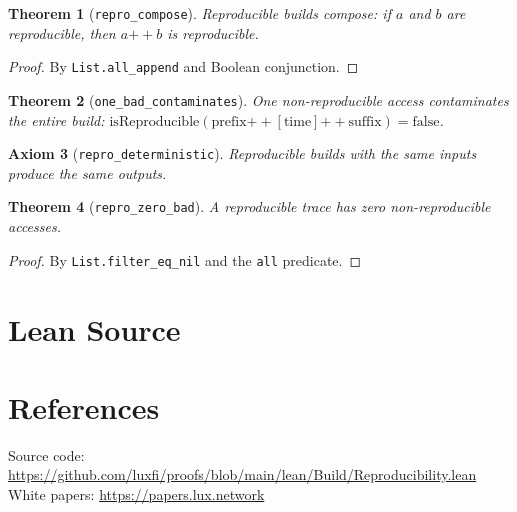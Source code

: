 \documentclass[11pt]{article}
\newtheorem{theorem}{Theorem}
\newtheorem{axiom_stmt}[theorem]{Axiom}
\begin{document}
\begin{theorem}[\texttt{repro\_compose}]
Reproducible builds compose: if $a$ and $b$ are reproducible, then $a \mathbin{++} b$ is reproducible.
\end{theorem}
\begin{proof}
By \texttt{List.all\_append} and Boolean conjunction.
\end{proof}

\begin{theorem}[\texttt{one\_bad\_contaminates}]
One non-reproducible access contaminates the entire build: $\text{isReproducible}(\text{prefix} \mathbin{++} [\text{time}] \mathbin{++} \text{suffix}) = \text{false}$.
\end{theorem}

\begin{axiom_stmt}[\texttt{repro\_deterministic}]
Reproducible builds with the same inputs produce the same outputs.
\end{axiom_stmt}

\begin{theorem}[\texttt{repro\_zero\_bad}]
A reproducible trace has zero non-reproducible accesses.
\end{theorem}
\begin{proof}
By \texttt{List.filter\_eq\_nil} and the \texttt{all} predicate.
\end{proof}


\section{Lean Source}


\section{References}
\noindent Source code: \url{https://github.com/luxfi/proofs/blob/main/lean/Build/Reproducibility.lean}\\
\noindent White papers: \url{https://papers.lux.network}
\end{document}
